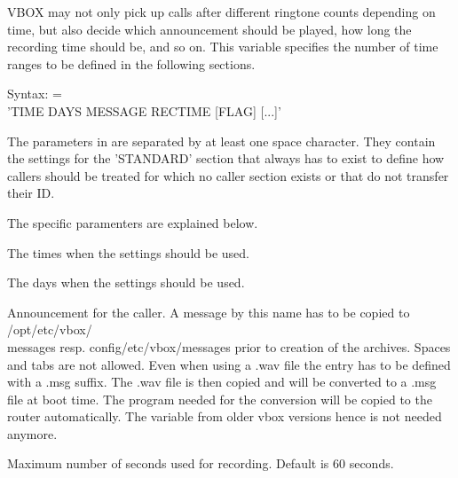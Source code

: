 \begin{description}


    VBOX may not only pick up calls after different ringtone counts depending on time, but also
    decide which announcement should be played, how long the recording time should be, and so on.
    This variable specifies the number of time ranges to be defined in the following sections.


    Syntax: =\\'TIME DAYS MESSAGE RECTIME [FLAG] [...]'
    
    The parameters in  are separated by at least one space character.
    They contain the settings for the 'STANDARD' section that always has to exist to define how
    callers should be treated for which no caller section exists or that do not transfer their ID.
    
    The specific paramenters are explained below.

    
    
    The times when the settings should be used.

    
    
    The days when the settings should be used.

    
    
    Announcement for the caller. A message by this name has to be copied to
    /opt/etc/vbox/\\messages resp. config/etc/vbox/messages prior to creation of the archives.
    Spaces and tabs are not allowed. Even when using a .wav file the entry has to be defined
    with a .msg suffix. The .wav file is then copied and will be converted to a .msg file
    at boot time. The program  needed for the conversion will be copied to the router
    automatically. The variable  from older vbox versions hence is not
    needed anymore.

    
    Maximum number of seconds used for recording. Default is 60 seconds.


    

\end{description}
